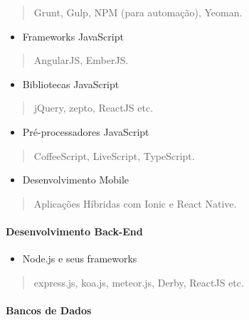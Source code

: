 \documentclass[]{article}
\providecommand{\tightlist}{%
  \setlength{\itemsep}{0pt}\setlength{\parskip}{0pt}}
\let\oldparagraph\paragraph
\renewcommand{\paragraph}[1]{\oldparagraph{#1}\mbox{}}
\begin{document}
\begin{quote}
Grunt, Gulp, NPM (para automação), Yeoman.
\end{quote}

\begin{itemize}
\tightlist
\item
  Frameworks JavaScript
\end{itemize}

\begin{quote}
AngularJS, EmberJS.
\end{quote}

\begin{itemize}
\tightlist
\item
  Bibliotecas JavaScript
\end{itemize}

\begin{quote}
jQuery, zepto, ReactJS etc.
\end{quote}

\begin{itemize}
\tightlist
\item
  Pré-processadores JavaScript
\end{itemize}

\begin{quote}
CoffeeScript, LiveScript, TypeScript.
\end{quote}

\begin{itemize}
\tightlist
\item
  Desenvolvimento Mobile
\end{itemize}

\begin{quote}
Aplicações Híbridas com Ionic e React Native.
\end{quote}

\paragraph{Desenvolvimento Back-End}\label{desenvolvimento-back-end}

\begin{itemize}
\tightlist
\item
  Node.js e seus frameworks
\end{itemize}

\begin{quote}
express.js, koa.js, meteor.js, Derby, ReactJS etc.
\end{quote}

\paragraph{Bancos de Dados}\label{bancos-de-dados}
\end{document}
